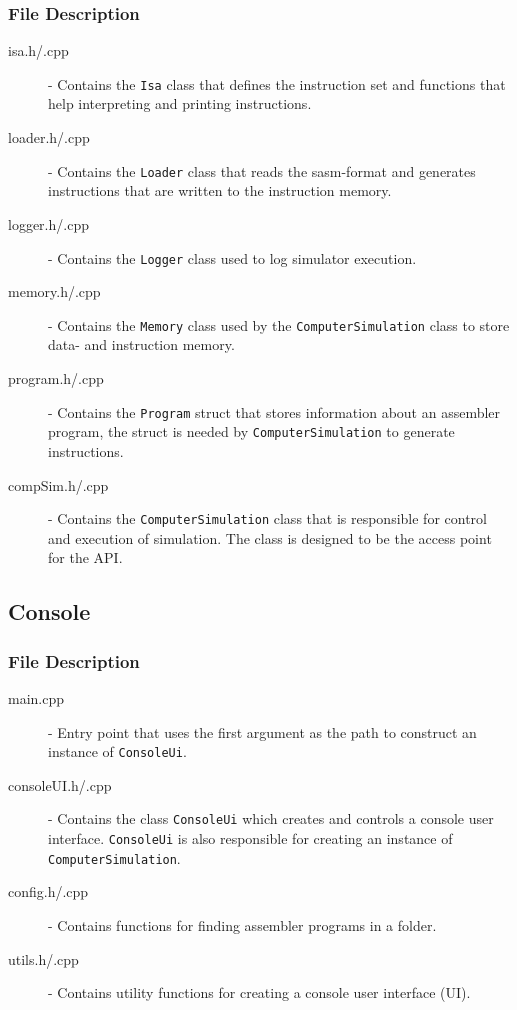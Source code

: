 \subsubsection{File Description}
\begin{description}
\item[isa.h/.cpp] - Contains the \texttt{Isa} class that defines the instruction set and functions that help interpreting and printing instructions.

\item[loader.h/.cpp] - Contains the \texttt{Loader} class that reads the sasm-format and generates instructions that are written to the instruction memory.


\item[logger.h/.cpp] - Contains the \texttt{Logger} class used to log simulator execution. 

\item[memory.h/.cpp] - Contains the \texttt{Memory} class used by the \texttt{ComputerSimulation} class to store data- and instruction memory. 

\item[program.h/.cpp] - Contains the \texttt{Program} struct that stores information about an assembler program, the struct is needed by \texttt{ComputerSimulation} to generate instructions.

\item[compSim.h/.cpp] - Contains the \texttt{ComputerSimulation} class that is responsible for control and execution of simulation. The class is designed to be the access point for the API. 
\end{description}

\subsection{Console}
\subsubsection{File Description}
\begin{description}
\item[main.cpp] - Entry point that uses the first argument as the path to construct an instance of \texttt{ConsoleUi}. 

\item[consoleUI.h/.cpp] - Contains the class \texttt{ConsoleUi} which creates and controls a console user interface. \texttt{ConsoleUi} is also responsible for creating an instance of \texttt{ComputerSimulation}.
\item[config.h/.cpp] - Contains functions for finding assembler programs in a folder.
\item[utils.h/.cpp] - Contains utility functions for creating a console user interface ({UI}).
\end{description}

